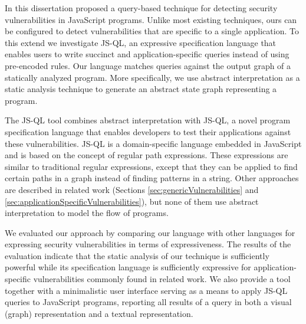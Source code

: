 In this dissertation proposed a query-based technique for detecting security vulnerabilities in JavaScript programs. 
Unlike most existing techniques, ours can be configured to detect vulnerabilities that are specific to a single application. To this extend we investigate JS-QL, an expressive specification language that enables users to write succinct and application-specific queries instead of using pre-encoded rules. Our language matches queries against the output graph of a statically analyzed program. More specifically, we use abstract interpretation as a static analysis technique to generate an abstract state graph representing a program.


The JS-QL tool combines abstract interpretation with JS-QL, a novel program specification language that enables developers to test their applications against these vulnerabilities. JS-QL is a domain-specific language embedded in JavaScript and is based on the concept of regular path expressions. These expressions are similar to traditional regular expressions, except that they can be applied to find certain paths in a graph instead of finding patterns in a string. Other approaches are described in related work (Sections \ref{sec:genericVulnerabilities} and \ref{sec:applicationSpecificVulnerabilities}), but none of them use abstract interpretation to model the flow of programs.

We evaluated our approach by comparing our language with other languages for expressing security vulnerabilities in terms of expressiveness. The results of the evaluation indicate that the static analysis of our technique is sufficiently powerful while its specification language is sufficiently expressive for application-specific vulnerabilities commonly found in related work. We also provide a tool together with a minimalistic user interface serving as a means to apply JS-QL queries to JavaScript programs, reporting all results of a query in both a visual (graph) representation and a textual representation. 

